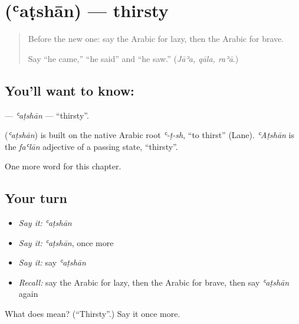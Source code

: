 \section[\texorpdfstring{\ar{عطشان} (ʿaṭshān)}{عطشان (ʿaṭshān)}]{ (ʿaṭshān) — thirsty}

\label{lesson:AR-C153-atshan}



\begin{quote}
Before the new one: say the Arabic for lazy, then the Arabic for brave.

Say \textquotedblleft{}he came,\textquotedblright{} \textquotedblleft{}he said\textquotedblright{} and \textquotedblleft{}he saw.\textquotedblright{} (\emph{Jāʾa, qāla, raʾā}.)
\end{quote}

\subsection*{You'll want to know: }
\textbf{} — \emph{ʿaṭshān} — \textquotedblleft{}thirsty\textquotedblright{}.

\begin{cousinweb}
\textbf{} (\emph{ʿaṭshān}) is built on the native Arabic root \emph{ʿ-ṭ-sh}, \textquotedblleft{}to thirst\textquotedblright{} (Lane). \emph{ʿAṭshān} is the \emph{faʿlān} adjective of a passing state, \textquotedblleft{}thirsty\textquotedblright{}.
\end{cousinweb}

\begin{grammarlens}[title={What you've built}]
One more word for this chapter.
\end{grammarlens}

\subsection*{Your turn}
\begin{itemize}
\raggedright
  \item \emph{Say it:} \emph{ʿaṭshān}
  \item \emph{Say it:} \emph{ʿaṭshān}, once more
  \item \emph{Say it:} say \emph{ʿaṭshān}
  \item \emph{Recall:} say the Arabic for lazy, then the Arabic for brave, then say \emph{ʿaṭshān} again
\end{itemize}

\begin{tcolorbox}[breakable,colback=teal!4,colframe=teal!35!black,title={Before you move on}]
What does  mean? (\textquotedblleft{}Thirsty\textquotedblright{}.) Say it once more.
\end{tcolorbox}

